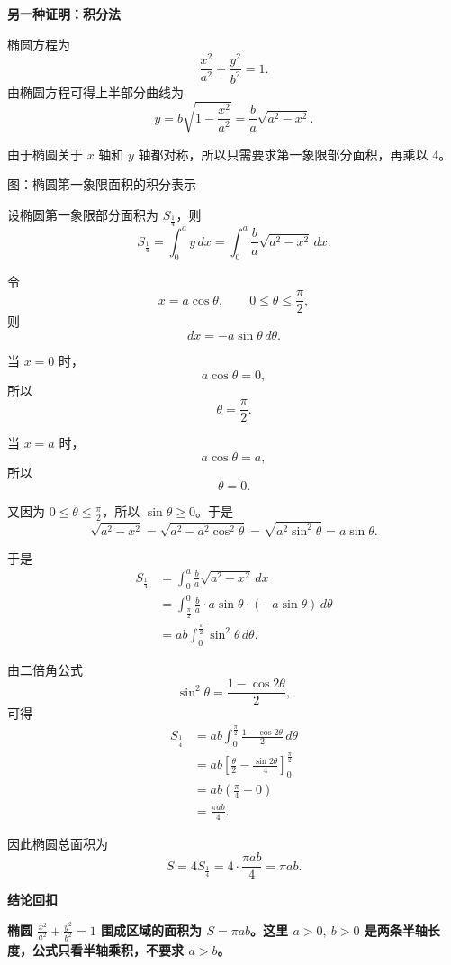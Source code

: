 \begin{proofbox}
\medskip
\textbf{\textcolor{CProof}{另一种证明：积分法}}

椭圆方程为
\[
\frac{x^2}{a^2}+\frac{y^2}{b^2}=1.
\]
由椭圆方程可得上半部分曲线为
\[
y
=
b\sqrt{1-\frac{x^2}{a^2}}
=
\frac{b}{a}\sqrt{a^2-x^2}.
\]

由于椭圆关于 $x$ 轴和 $y$ 轴都对称，所以只需要求第一象限部分面积，再乘以 $4$。

\medskip
\begin{center}


\vspace{0.5em}
\small 图：椭圆第一象限面积的积分表示
\end{center}

设椭圆第一象限部分面积为 $S_{\frac14}$，则
\[
S_{\frac14}
=
\int_0^a y\,dx
=
\int_0^a
\frac{b}{a}\sqrt{a^2-x^2}\,dx.
\]

令
\[
x=a\cos\theta,\qquad 0\le \theta\le \frac{\pi}{2},
\]
则
\[
dx=-a\sin\theta\,d\theta.
\]

当 $x=0$ 时，
\[
a\cos\theta=0,
\]
所以
\[
\theta=\frac{\pi}{2}.
\]

当 $x=a$ 时，
\[
a\cos\theta=a,
\]
所以
\[
\theta=0.
\]

又因为 \(0\le \theta\le \frac{\pi}{2}\)，所以 \(\sin\theta\ge 0\)。于是
\[
\sqrt{a^2-x^2}
=
\sqrt{a^2-a^2\cos^2\theta}
=
\sqrt{a^2\sin^2\theta}
=
a\sin\theta.
\]

于是
\[
\begin{aligned}
S_{\frac14}
&=
\int_0^a
\frac{b}{a}\sqrt{a^2-x^2}\,dx \\[0.5em]
&=
\int_{\frac{\pi}{2}}^0
\frac{b}{a}\cdot a\sin\theta
\cdot
\left(-a\sin\theta\right)
\,d\theta \\[0.5em]
&=
ab\int_0^{\frac{\pi}{2}}\sin^2\theta\,d\theta.
\end{aligned}
\]

由二倍角公式
\[
\sin^2\theta=\frac{1-\cos 2\theta}{2},
\]
可得
\[
\begin{aligned}
S_{\frac14}
&=
ab\int_0^{\frac{\pi}{2}}
\frac{1-\cos 2\theta}{2}
\,d\theta \\[0.5em]
&=
ab
\left[
\frac{\theta}{2}
-
\frac{\sin 2\theta}{4}
\right]_0^{\frac{\pi}{2}} \\[0.5em]
&=
ab
\left(
\frac{\pi}{4}-0
\right) \\[0.5em]
&=
\frac{\pi ab}{4}.
\end{aligned}
\]

因此椭圆总面积为
\[
S
=
4S_{\frac14}
=
4\cdot \frac{\pi ab}{4}
=
\pi ab.
\]

\medskip
\textbf{\textcolor{CProof}{结论回扣}}

\textbf{椭圆 $\frac{x^2}{a^2}+\frac{y^2}{b^2}=1$ 围成区域的面积为 $S=\pi ab$。这里 $a>0,\ b>0$ 是两条半轴长度，公式只看半轴乘积，不要求 $a>b$。}
\end{proofbox}